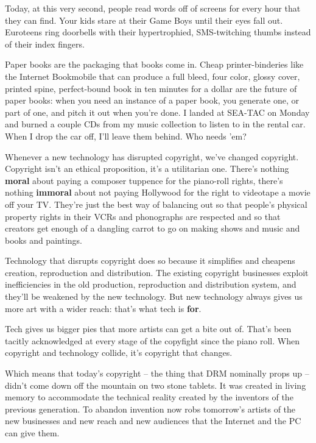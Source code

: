 Today, at this very second, people read words off of screens for
every hour that they can find. Your kids stare at their Game Boys
until their eyes fall out. Euroteens ring doorbells with their
hypertrophied, SMS-twitching thumbs instead of their index
fingers.

Paper books are the packaging that books come in. Cheap
printer-binderies like the Internet Bookmobile that can produce a
full bleed, four color, glossy cover, printed spine, perfect-bound
book in ten minutes for a dollar are the future of paper books:
when you need an instance of a paper book, you generate one, or
part of one, and pitch it out when you're done. I landed at SEA-TAC
on Monday and burned a couple CDs from my music collection to
listen to in the rental car. When I drop the car off, I'll leave
them behind. Who needs 'em?

Whenever a new technology has disrupted copyright, we've changed
copyright. Copyright isn't an ethical proposition, it's a
utilitarian one. There's nothing \textbf{moral} about paying a
composer tuppence for the piano-roll rights, there's nothing
\textbf{immoral} about not paying Hollywood for the right to
videotape a movie off your TV. They're just the best way of
balancing out so that people's physical property rights in their
VCRs and phonographs are respected and so that creators get enough
of a dangling carrot to go on making shows and music and books and
paintings.

Technology that disrupts copyright does so because it simplifies
and cheapens creation, reproduction and distribution. The existing
copyright businesses exploit inefficiencies in the old production,
reproduction and distribution system, and they'll be weakened by
the new technology. But new technology always gives us more art
with a wider reach: that's what tech is \textbf{for}.

Tech gives us bigger pies that more artists can get a bite out of.
That's been tacitly acknowledged at every stage of the copyfight
since the piano roll. When copyright and technology collide, it's
copyright that changes.

Which means that today's copyright -- the thing that DRM nominally
props up -- didn't come down off the mountain on two stone tablets.
It was created in living memory to accommodate the technical
reality created by the inventors of the previous generation. To
abandon invention now robs tomorrow's artists of the new businesses
and new reach and new audiences that the Internet and the PC can
give them.

